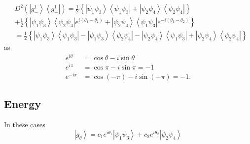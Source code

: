 \documentclass[aps,preprint]{revtex4}%
\begin{document}
\begin{align*}
&  D^{2}\left(  \left\vert g_{-}^{1}\right\rangle \left\langle g_{-}%
^{1}\right\vert \right)  =\frac{1}{2}\left\{  \left\vert \psi_{1}\psi
_{3}\right\rangle \left\langle \psi_{1}\psi_{3}\right\vert +\left\vert
\psi_{2}\psi_{4}\right\rangle \left\langle \psi_{2}\psi_{4}\right\vert
\right\} \\
&  +\frac{1}{2}\left\{  \left\vert \psi_{1}\psi_{3}\right\rangle \left\langle
\psi_{2}\psi_{4}\right\vert e^{i\left(  \theta_{1}-\theta_{2}\right)
}+\left\vert \psi_{2}\psi_{4}\right\rangle \left\langle \psi_{1}\psi
_{3}\right\vert e^{-i\left(  \theta_{1}-\theta_{2}\right)  }\right\} \\
&  =\frac{1}{2}\left\{  \left\vert \psi_{1}\psi_{3}\right\rangle \left\langle
\psi_{1}\psi_{3}\right\vert -\left\vert \psi_{1}\psi_{3}\right\rangle
\left\langle \psi_{2}\psi_{4}\right\vert -\left\vert \psi_{2}\psi
_{4}\right\rangle \left\langle \psi_{1}\psi_{3}\right\vert +\left\vert
\psi_{2}\psi_{4}\right\rangle \left\langle \psi_{2}\psi_{4}\right\vert
\right\}
\end{align*}
as
\begin{align*}
e^{i\theta}  &  =\cos\theta-i\sin\theta\\
e^{i\pi}  &  =\cos\pi-i\sin\pi=-1\\
e^{-i\pi}  &  =\cos\left(  -\pi\right)  -i\sin\left(  -\pi\right)  =-1.
\end{align*}


\subsection{Energy}

In these cases
\[
\left\vert g_{\theta}\right\rangle =c_{1}e^{i\theta_{1}}\left\vert \psi
_{1}\psi_{3}\right\rangle +c_{2}e^{i\theta_{2}}\left\vert \psi_{2}\psi
_{4}\right\rangle
\]
\end{document}
